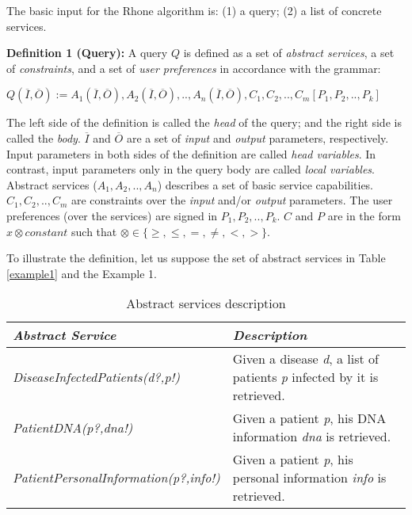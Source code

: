 The basic input for the Rhone algorithm is: (1) a query; (2) a list of concrete services.

\noindent \textbf{Definition 1 (Query):} 
A query $Q$ is defined as a set of \textit{abstract services}, a set of \textit{constraints}, and a set of \textit{user preferences} in accordance with the grammar: 
\begin{center}
$Q (\overline{I}, \overline{O}) := A_{1}(\overline{I}, \overline{O}), A_{2}(\overline{I}, \overline{O}), ..,  A_{n}(\overline{I}, \overline{O}),C_{1},C_{2}, .., C_{m}[P_{1},P_{2}, .., P_{k}]$
\end{center}  
The left side of the definition is called the \textit{head} of the query; and the right side is called the \textit{body}. 
$\overline{I}$ and $\overline{O}$ are a set of \textit{input} and \textit{output} parameters, respectively.
Input parameters in both sides of the definition are called \textit{head variables}.
In contrast, input parameters only in the query body are called \textit{local variables}.
Abstract services ($A_{1}, A_{2}, .., A_{n}$) describes a set of basic service capabilities.
$C_{1}, C_{2}, .., C_{m}$ are constraints over the \textit{input} and/or \textit{output} parameters.
The user preferences (over the services) are signed in $P_{1}, P_{2}, .., P_{k}$. $C$ and $P$ are in the form $x \otimes constant$ such that $\otimes \in\lbrace \geq, \leq, =, \neq, <, >\rbrace$.

To illustrate the definition, let us suppose the set of abstract services in Table \ref{example1} and the Example 1.

\begin{table}[h]
\center
\begin{tabular}{|p{7cm}|p{7cm}|}
\hline 
\textbf{\textit{Abstract Service}} & \textbf{\textit{Description}} \\ 
\hline 
\textit{DiseaseInfectedPatients(d?,p!)} & Given a disease \textit{d}, a list of patients \textit{p} infected by it is retrieved. \\ 
\hline 
\textit{PatientDNA(p?,dna!)} & Given a patient \textit{p}, his DNA information \textit{dna} is retrieved. \\ 
\hline 
\textit{PatientPersonalInformation(p?,info!)} & Given a patient \textit{p}, his personal information \textit{info} is retrieved. \\ 
\hline 
\end{tabular} \caption{Abstract services description}
\end{table}\label{example1}


